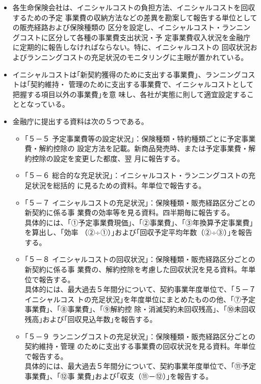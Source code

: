 \documentclass[report,gutter=10mm,fore-edge=10mm,uplatex,dvipdfmx]{jlreq}
\begin{document}
\begin{itemize}
 \item[] 各生命保険会社は、イニシャルコストの負担方法、イニシャルコストを回収するための予定
 事業費の収納方法などの差異を勘案して報告する単位としての販売経路および保険種類の
 区分を設定し、イニシャルコスト・ランニングコストに区分して各種の事業費支出状況・予
 定事業費収入状況を金融庁に定期的に報告しなければならない。特に、イニシャルコストの
 回収状況およびランニングコストの充足状況のモニタリングに主眼が置かれている。
 \item[] イニシャルコストは｢新契約獲得のために支出する事業費｣、ランニングコストは｢契約維持・
 管理のために支出する事業費で、イニシャルコストとして把握する項目以外の事業費｣を意
 味し、各社が実態に則して適宜設定することとなっている。
 \item[] 金融庁に提出する資料は次の５つである。
 \begin{itemize}
 \item[] ｢５－５ 予定事業費等の設定状況｣：保険種類・特約種類ごとに予定事業費・解約控除の
 設定方法を記載。新商品発売時、または予定事業費・解約控除の設定を変更した都度、翌
 月に報告する。
 \item[] ｢５－６ 総合的な充足状況｣：イニシャルコスト・ランニングコストの充足状況を総括的
 に見るための資料。年単位で報告する。
 \item[] ｢５－７ イニシャルコストの充足状況｣：保険種類・販売経路区分ごとの新契約に係る事
 業費の効率等を見る資料。四半期毎に報告する。\\
 具体的には、｢①予定事業費現価｣、｢②事業費｣、｢③年換算予定事業費｣を算出し、｢効率
 （②÷①）｣および｢回収予定平均年数（②÷③）｣を報告する。
 \item[] ｢５－８ イニシャルコストの回収状況｣：保険種類・販売経路区分ごとの新契約に係る事
 業費の、解約控除を考慮した回収状況を見る資料。年単位で報告する。\\
 具体的には、最大過去５年間分について、契約事業年度単位で、｢５－７ イニシャルコス
 トの充足状況｣を年度単位にまとめたものの他、｢⑦予定事業費｣、｢⑧事業費｣、｢⑨解約控
 除・消滅契約未回収残高｣、｢⑩未回収残高｣および｢回収見込年数｣を報告する。
 \item[] ｢５－９ ランニングコストの充足状況｣：保険種類・販売経路区分ごとの契約維持・管理
 のために支出する事業費の回収状況を見る資料。年単位で報告する。\\
 具体的には、最大過去５年間分について、契約事業年度単位で、｢⑪予定事業費｣、｢⑫事
 業費｣および｢収支（⑪－⑫）｣を報告する。
 \end{itemize}
\end{itemize}
\end{document}
